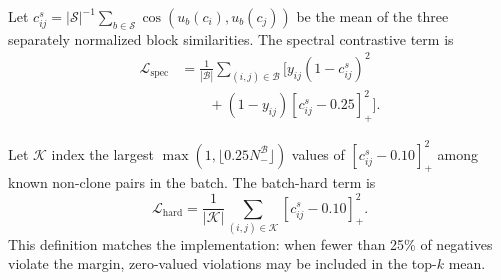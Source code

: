 \documentclass[authoryear,final,5p,times,twocolumn]{elsarticle}
\newcommand{\relu}[1]{\left[#1\right]_{+}}
\newcommand{\added}[1]{{\color{green!50!black}#1}}
\theoremstyle{plain}
\begin{document}
Let $c^s_{ij}=|\mathcal{S}|^{-1}\sum_{b\in\mathcal{S}}
\cos(u_b(c_i),u_b(c_j))$ be the mean of the three separately normalized
block similarities. The spectral contrastive term is
\begin{equation}
\begin{aligned}
\mathcal{L}_{\mathrm{spec}}
&=\frac{1}{|\mathcal{B}|}
\sum_{(i,j)\in\mathcal{B}}
\bigl[y_{ij}(1-c^s_{ij})^2\\
&\qquad +(1-y_{ij})\relu{c^s_{ij}-0.25}^{2}\bigr].
\end{aligned}
\label{eq:spectral_contrastive}
\end{equation}

Let $\mathcal{K}$ index the largest
$\max(1,\lfloor0.25N_-^{\mathcal{B}}\rfloor)$ values of
$\relu{c^s_{ij}-0.10}^{2}$ among known non-clone pairs in the batch. The
batch-hard term is
\begin{equation}
\mathcal{L}_{\mathrm{hard}}=
\frac{1}{|\mathcal{K}|}\sum_{(i,j)\in\mathcal{K}}
\relu{c^s_{ij}-0.10}^{2}.
\label{eq:hard_negative}
\end{equation}
\added{This definition matches the implementation: when fewer than 25\% of negatives
violate the margin, zero-valued violations may be included in the top-$k$ mean.
}
\end{document}
